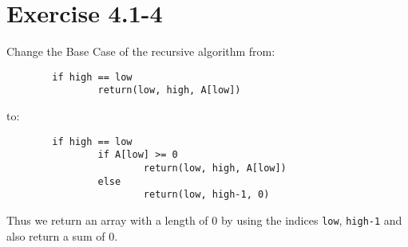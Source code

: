 \documentclass{article}
\begin{document}
\section*{Exercise 4.1-4}

Change the Base Case of the recursive algorithm from:
\begin{verbatim}
        if high == low
                return(low, high, A[low])
\end{verbatim}
to:
\begin{verbatim}
        if high == low
                if A[low] >= 0
                        return(low, high, A[low])
                else
                        return(low, high-1, 0)
\end{verbatim}
Thus we return an array with a length of $0$ by using the indices \texttt{low}, \texttt{high-1} and also return a sum of $0$.
\end{document}
